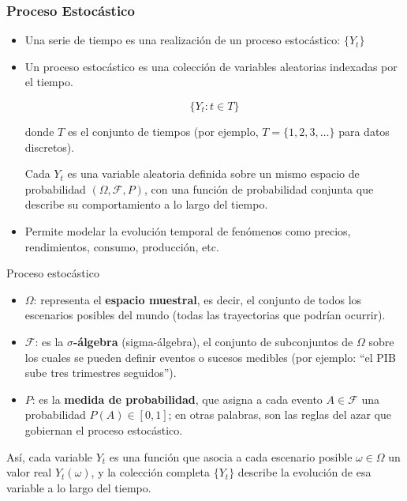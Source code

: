 \documentclass{beamer}
\begin{document}
\begin{frame}
\frametitle{Proceso Estocástico}
\begin{itemize}
    \item Una serie de tiempo es una realización de un proceso estocástico: \(\{Y_t\}\)
    \item Un proceso estocástico es una colección de variables aleatorias indexadas por el tiempo.

    \[
\{ Y_t : t \in T \}
\]

donde \( T \) es el conjunto de tiempos (por ejemplo, \( T = \{1, 2, 3, \dots\} \) para datos discretos).

Cada \( Y_t \) es una variable aleatoria definida sobre un mismo espacio de probabilidad 
\((\Omega, \mathcal{F}, P)\), con una función de probabilidad conjunta que describe su comportamiento 
a lo largo del tiempo.

    \item Permite modelar la evolución temporal de fenómenos como precios, rendimientos, consumo, producción, etc.
\end{itemize}


\end{frame}

\begin{frame}{Proceso estocástico}
   \begin{itemize}
    \item \( \Omega \): representa el \textbf{espacio muestral}, es decir, el conjunto de todos los escenarios posibles del mundo 
    (todas las trayectorias que podrían ocurrir).

    \item \( \mathcal{F} \): es la \textbf{\(\sigma\)-álgebra} (sigma-álgebra), el conjunto de subconjuntos de \( \Omega \) sobre los cuales 
    se pueden definir eventos o sucesos medibles (por ejemplo: ``el PIB sube tres trimestres seguidos'').

    \item \( P \): es la \textbf{medida de probabilidad}, que asigna a cada evento \( A \in \mathcal{F} \) una probabilidad
    \( P(A) \in [0,1] \); en otras palabras, son las reglas del azar que gobiernan el proceso estocástico.
\end{itemize}

Así, cada variable \( Y_t \) es una función que asocia a cada escenario posible \( \omega \in \Omega \) 
un valor real \( Y_t(\omega) \), y la colección completa \( \{Y_t\} \) describe la evolución de esa variable a lo largo del tiempo.
 
\end{frame}
\end{document}
